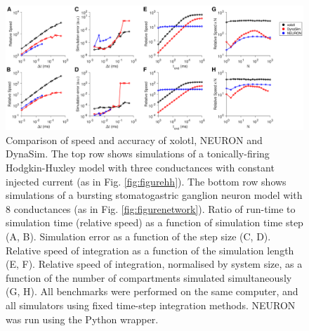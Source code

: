 \documentclass{frontiersSCNS} %
\begin{document}
\begin{figure}
	\centering
	\includegraphics[width=1.0\linewidth]{gfx/figure_benchmark}
	\caption{Comparison of speed and accuracy of xolotl, NEURON and DynaSim. The top row shows simulations of a tonically-firing Hodgkin-Huxley model with three conductances with constant injected current (as in Fig. \ref{fig:figurehh}). The bottom row shows simulations of  a bursting stomatogastric ganglion neuron model with 8 conductances (as in Fig. \ref{fig:figurenetwork}). Ratio of run-time to simulation time (relative speed) as a function of simulation time step (A, B). Simulation error as a function of the step size (C, D).  Relative speed of integration as a function of the simulation length (E, F). Relative speed of integration, normalised by system size, as a function of the number of compartments simulated simultaneously (G, H). All benchmarks were performed on the same computer, and all simulators using fixed time-step integration methods. NEURON was run using the Python wrapper. }
	\label{fig:figurebenchmark}
\end{figure}
\end{document}
